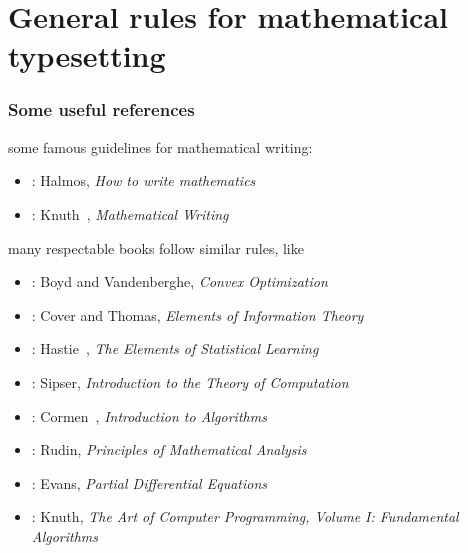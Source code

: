 \documentclass[usepdftitle=false]{beamer}
\begin{document}
\section{General rules for mathematical typesetting}
\begin{frame}
    \frametitle{Some useful references}

    some famous guidelines for mathematical writing:
    \begin{itemize}\itemsep=6pt
        \item \cite{Halmos:1970}: Halmos, \emph{How to write mathematics}
        \item \cite{Knuth:1989}: Knuth~\etal, \emph{Mathematical Writing}
    \end{itemize}
    \vspace*{10pt}

    many respectable books follow similar rules, like
    \begin{itemize}\itemsep=6pt
        \item \cite{boyd2004convex}: Boyd and Vandenberghe, \emph{Convex Optimization}
        \item \cite{Cover:1991}: Cover and Thomas, \emph{Elements of Information Theory}
        \item \cite{Hastie:2001}: Hastie~\etal, \emph{The Elements of Statistical Learning}
        \item \cite{Sipser:2001}: Sipser, \emph{Introduction to the Theory of Computation}
        \item \cite{Cormen:2001}: Cormen~\etal, \emph{Introduction to Algorithms}
        \item \cite{Rudin:1976}: Rudin, \emph{Principles of Mathematical Analysis}
        \item \cite{Evans:2010}: Evans, \emph{Partial Differential Equations}
        \item \cite{Knuth:1973}: Knuth, \emph{The Art of Computer Programming, Volume I: Fundamental Algorithms}
    \end{itemize}
\end{frame}
\end{document}
